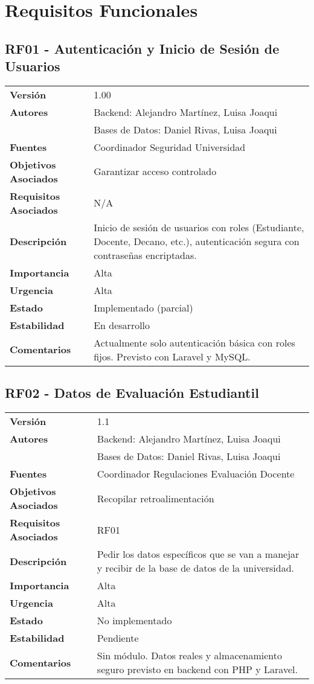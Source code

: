 \documentclass{article}
\begin{document}
\section*{Requisitos Funcionales}

\subsection*{RF01 - Autenticación y Inicio de Sesión de Usuarios}
\begin{longtable}{>{\bfseries}l p{}}
Versión & 1.00 \\
Autores & Backend: Alejandro Martínez, Luisa Joaqui \\ 
        & Bases de Datos: Daniel Rivas, Luisa Joaqui \\
Fuentes & Coordinador Seguridad Universidad \\
Objetivos Asociados & Garantizar acceso controlado \\
Requisitos Asociados & N/A \\
Descripción & Inicio de sesión de usuarios con roles (Estudiante, Docente, Decano, etc.), autenticación segura con contraseñas encriptadas. \\
Importancia & Alta \\
Urgencia & Alta \\
Estado & Implementado (parcial) \\
Estabilidad & En desarrollo \\
Comentarios & Actualmente solo autenticación básica con roles fijos. Previsto con Laravel y MySQL. \\
\end{longtable}

\subsection*{RF02 - Datos de Evaluación Estudiantil}
\begin{longtable}{>{\bfseries}l p{}}
Versión & 1.1 \\
Autores & Backend: Alejandro Martínez, Luisa Joaqui \\ 
        & Bases de Datos: Daniel Rivas, Luisa Joaqui \\
Fuentes & Coordinador Regulaciones Evaluación Docente \\
Objetivos Asociados & Recopilar retroalimentación \\
Requisitos Asociados & RF01 \\
Descripción & Pedir los datos específicos que se van a manejar y recibir de la base de datos de la universidad. \\
Importancia & Alta \\
Urgencia & Alta \\
Estado & No implementado \\
Estabilidad & Pendiente \\
Comentarios & Sin módulo. Datos reales y almacenamiento seguro previsto en backend con PHP y Laravel. \\
\end{longtable}
\end{document}
